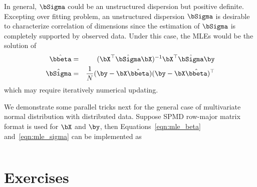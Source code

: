 In general, $\bSigma$ could be an unstructured dispersion but positive
definite. Excepting over fitting problem,
an unstructured dispersion $\bSigma$ is desirable to
characterize correlation of dimensions since the estimation of
$\bSigma$ is completely supported by observed data.
Under this case, the MLEs would be the solution of
\begin{eqnarray}
\hat{\bbeta} & = & (\bX^\top \hat{\bSigma} \bX)^{-1}
                   \bX^\top \hat{\bSigma} \by
                   \label{eqn:mle_beta} \\
\hat{\bSigma} & = & \frac{1}{N} (\by - \bX\hat{\bbeta})
                                (\by - \bX\hat{\bbeta})^\top
                   \label{eqn:mle_sigma}
\end{eqnarray}
which may require iteratively numerical updating.

We demonstrate some parallel tricks next for the general case of
multivariate normal distribution with distributed data.
Suppose SPMD row-major matrix format is used for $\bX$ and $\by$, then
Equations~\ref{eqn:mle_beta} and~\ref{eqn:mle_sigma} can be implemented
as
\begin{lstlisting}[language=rr,title=R Code]

\end{lstlisting}












\section{Exercises}
\label{sec:mle_exercise}

